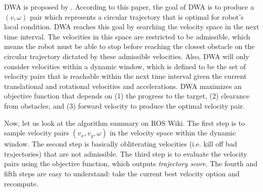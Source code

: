\documentclass[12pt]{article}
\begin{document}
\begin{center}
\setlength{\fboxsep}{1em}
\end{center}

\noindent DWA is proposed by \cite{fox1997dynamic}. According to this paper, the goal of DWA is to produce a $(v,\omega)$ pair which
represents a circular trajectory that is optimal for robot's local condition. DWA reaches this goal by searching the velocity space in the next time interval.
The velocities in this space are restricted to be admissible, which means the robot must be able to stop before reaching the closest obstacle on the
circular trajectory dictated by these admissible velocities. Also, DWA will only consider velocities within a dynamic window, which is defined to be the
set of velocity pairs that is reachable within the next time interval given the current translational and rotational velocities and accelerations. DWA maximizes an objective
function that depends on (1) the progress to the target, (2) clearance from obstacles, and (3) forward velocity to produce the optimal velocity pair.

Now, let us look at the algorithm summary on ROS Wiki. The first step is to sample velocity pairs $(v_x, v_y, \omega)$ in
the velocity space within the dynamic window. The second step is basically obliterating velocities (i.e. kill off bad trajectories) that are not admissible. The third step is
to evaluate the velocity pairs using the objective function, which outputs \textit{trajectory score}. The fourth and fifth steps are easy to understand: take the current best
velocity option and recompute.\\
\end{document}
